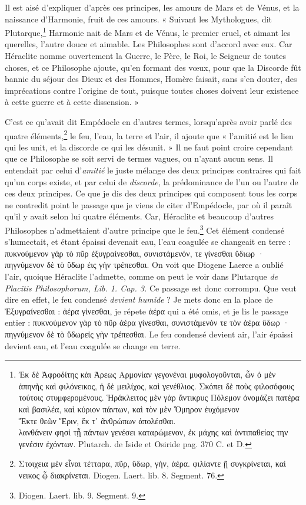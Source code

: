 \documentclass[a4paper, 11pt, oneside, polutonikogreek, french]{article}
\begin{document}
Il est aisé d'expliquer d'après ces principes, les amours de Mars et de Vénus, et la naissance d'Harmonie, fruit de ces amours. « Suivant les Mythologues, dit Plutarque,\footnote{Ἐκ δὲ Ἀφροδίτης κὰι Ἁρεως Αρμονίαν γεγονέναι μυφολογοῦνται, ὧν ὁ μὲν ἀπηνὴς καὶ φιλόνεικος, ἡ δὲ μειλίχος, καὶ γενέθλιος. Σκόπει δὲ ποὺς φιλοσόφους τούτοις στυμφερομένους. Ἡράκλειτος μὲν γὰρ ἄντικρυς Πόλεμον ὀνομάζει πατέρα καὶ βασιλέα, καὶ κύριον πάντων, καὶ τὸν μὲν Ὄμηρον ἐυχόμενον\\\hspace*{5mm}Ἔκτε θεῶν Ἔριν, ἔκ τ᾽ ᾶνθρώπων ἀπολέσθαι.\\\hspace*{5mm}λανθάνειν φησὶ τᾖ πάντων γενέσει καταρώμενον, ἐκ μάχης καὶ ἀντιπαθείας την γενέσιν ἐχόντων. Plutarch. de Iside et Osiride pag. 370 C. et D.} Harmonie nait de Mars et de Vénus, le premier cruel, et aimant les querelles, l'autre douce et aimable. Les Philosophes sont d'accord avec eux. Car Héraclite nomme ouvertement la Guerre, le Père, le Roi, le Seigneur de toutes choses, et ce Philosophe ajoute, qu'en formant des vœux, pour que la Discorde fût bannie du séjour des Dieux et des Hommes, Homère faisait, sans s'en douter, des imprécations contre l'origine de tout, puisque toutes choses doivent leur existence à cette guerre et à cette dissension. »

C'est ce qu'avait dit Empédocle en d'autres termes, lorsqu'après avoir parlé des quatre éléments,\footnote{Στοιχεια μὲν εἶναι τέτταρα, πῦρ, ὕδωρ, γὴν, ἀέρα. φιλίαντε ῇ συγκρίνεται, καὶ νεικος ᾧ διακρίνεται. Diogen. Laert. lib. 8. Segment. 76.} le feu, l'eau, la terre et l'air, il ajoute que « l'amitié est le lien qui les unit, et la discorde ce qui les désunit. » Il ne faut point croire cependant que ce Philosophe se soit servi de termes vagues, ou n'ayant aucun sens. Il entendait par celui d'\emph{amitié} le juste mélange des deux principes contraires qui fait qu'un corps existe, et par celui de \emph{discorde}, la prédominance de l'un ou l'autre de ces deux principes. Ce que je dis des deux principes qui composent tous les corps ne contredit point le passage que je viens de citer d'Empédocle, par où il paraît qu'il y avait selon lui quatre éléments. Car, Héraclite et beaucoup d'autres Philosophes n'admettaient d'autre principe que le feu.\footnote{Diogen. Laert. lib. 9. Segment. 9.} Cet élément condensé s'humectait, et étant épaissi devenait eau, l'eau coagulée se changeait en terre : πυκνούμενον γάρ τὸ πῦρ ἐξυγραίνεσθαι, συνιστάμενόν, τε γίνεσθαι ὕδιωρ · πηγνύμενον δὲ τὸ ὕδωρ ἐις γὴν τρέπεσθαι. On voit que Diogene Laerce a oublié l'air, quoique Héraclite l'admette, comme on peut le voir dans Plutarque \emph{de Placitis Philosophorum, Lib. 1. Cap. 3.} Ce passage est donc corrompu. Que veut dire en effet, le feu condensé \emph{devient humide} ? Je mets donc en la place de Ἐξυγραίνεσθαι : ἀέρα γίνεσθαι, je répete ἀέρα qui a été omis, et je lis le passage entier : πυκνούμενον γὰρ τὸ πῦρ ἀέρα γίνεσθαι, συνιστάμενόν τε τὸν ἀέρα ὕδωρ · πηγνύμενον δὲ τὸ ὕδωρεἰς γὴν τρέπεσθαι. Le feu condensé devient air, l'air épaissi devient eau, et l'eau coagulée se change en terre.
\end{document}
